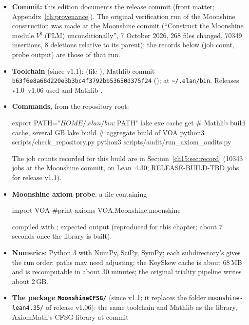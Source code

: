 \begin{itemize}
\item \textbf{Commit:} this edition documents the release commit \texttt{\bookcommit} (front matter;
  Appendix~\ref{ch:provenance}). The original verification run of the Moonshine construction was made at the Moonshine
  commit (``Construct the Moonshine module $V^\natural$ (FLM) unconditionally'', 7 October 2026, 268 files changed, 70349
  insertions, 8 deletions relative to its parent); the records below (job count, probe output) are those of that run.
\item \textbf{Toolchain} (since v1.1):  (file ), Mathlib
  commit \texttt{b63f6e8a68d220e3b3bc4f3792bb53650d375f24} ();  at
  \texttt{\textasciitilde/.elan/bin}. Releases v1.0--v1.06 used  and Mathlib
  .
\item \textbf{Commands}, from the repository root:
\begin{plaincode}
export PATH="$HOME/.elan/bin:$PATH"
lake exe cache get     # Mathlib build cache, several GB
lake build             # aggregate build of VOA
python3 scripts/check_repository.py
python3 scripts/audit/run_axiom_audits.py
\end{plaincode}
  The job counts recorded for this build are in Section~\ref{ch15:sec:record} (10343 jobs at the Moonshine commit, on
  Lean~4.30; RELEASE-BUILD-TBD jobs for release v1.1).
\item \textbf{Moonshine axiom probe}: a file containing
\begin{plaincode}
import VOA
#print axioms VOA.Moonshine.moonshine
\end{plaincode}
  compiled with ; expected output
  (reproduced for this chapter; about 7 seconds once the library is built).
\item \textbf{Numerics}: Python 3 with NumPy, SciPy, SymPy; each subdirectory's 
  gives the run order; paths may need adjusting; the KeySkew cache is about 68\,MB and is recomputable
  in about 30 minutes; the original triality pipeline writes about 2\,GB.
\item \textbf{The package \texttt{MoonshineCFSG/}} (since v1.1; it replaces the folder \texttt{moonshine-lean4.35/} of
  release v1.06): the same toolchain and Mathlib as the library, AxiomMath's CFSG library at commit

\end{itemize}
